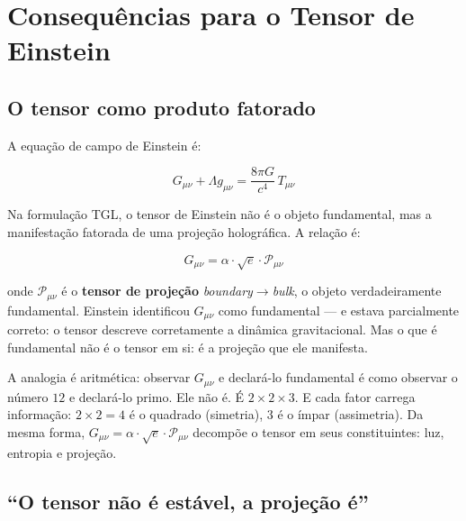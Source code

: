 \documentclass[12pt,a4paper,twoside]{article}
\newcommand{\boundary}{\textit{boundary}}
\newcommand{\bulk}{\textit{bulk}}
\begin{document}

\section{Consequências para o Tensor de Einstein}
\label{sec:tensor}

\subsection{O tensor como produto fatorado}

A equação de campo de Einstein é:

\begin{equation}
G_{\mu\nu} + \Lambda g_{\mu\nu} = \frac{8\pi G}{c^4}\, T_{\mu\nu}
\label{eq:einstein}
\end{equation}

Na formulação TGL, o tensor de Einstein não é o objeto fundamental, mas a manifestação fatorada de uma projeção holográfica. A relação é:

\begin{equationbox}[title={Tensor Fatorado}]
\begin{equation}
\boxed{G_{\mu\nu} = \alpha \cdot \sqrt{e} \cdot \mathcal{P}_{\mu\nu}}
\label{eq:tensor_fatorado}
\end{equation}
\end{equationbox}

\noindent onde $\mathcal{P}_{\mu\nu}$ é o \textbf{tensor de projeção} \boundary$\to$\bulk, o objeto verdadeiramente fundamental. Einstein identificou $G_{\mu\nu}$ como fundamental --- e estava parcialmente correto: o tensor descreve corretamente a dinâmica gravitacional. Mas o que é fundamental não é o tensor em si: é a projeção que ele manifesta.

A analogia é aritmética: observar $G_{\mu\nu}$ e declará-lo fundamental é como observar o número $12$ e declará-lo primo. Ele não é. É $2 \times 2 \times 3$. E cada fator carrega informação: $2 \times 2 = 4$ é o quadrado (simetria), $3$ é o ímpar (assimetria). Da mesma forma, $G_{\mu\nu} = \alpha \cdot \sqrt{e} \cdot \mathcal{P}_{\mu\nu}$ decompõe o tensor em seus constituintes: luz, entropia e projeção.

\subsection{``O tensor não é estável, a projeção é''}
\end{document}
